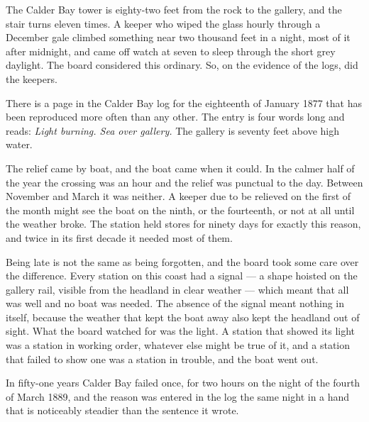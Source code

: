 \documentclass[11pt,twoside]{book}
\begin{document}
The Calder Bay tower is eighty-two feet from the rock to the gallery, and
the stair turns eleven times. A keeper who wiped the glass hourly through a
December gale climbed something near two thousand feet in a night, most of
it after midnight, and came off watch at seven to sleep through the short
grey daylight. The board considered this ordinary. So, on the evidence of the
logs, did the keepers.

There is a page in the Calder Bay log for the eighteenth of January 1877 that
has been reproduced more often than any other. The entry is four words long
and reads: \emph{Light burning. Sea over gallery.} The gallery is seventy
feet above high water.

\newpage

The relief came by boat, and the boat came when it could. In the calmer half
of the year the crossing was an hour and the relief was punctual to the day.
Between November and March it was neither. A keeper due to be relieved on the
first of the month might see the boat on the ninth, or the fourteenth, or not
at all until the weather broke. The station held stores for ninety days for
exactly this reason, and twice in its first decade it needed most of them.

Being late is not the same as being forgotten, and the board took some care
over the difference. Every station on this coast had a signal --- a shape
hoisted on the gallery rail, visible from the headland in clear weather ---
which meant that all was well and no boat was needed. The absence of the
signal meant nothing in itself, because the weather that kept the boat away
also kept the headland out of sight. What the board watched for was the
light. A station that showed its light was a station in working order,
whatever else might be true of it, and a station that failed to show one was
a station in trouble, and the boat went out.

In fifty-one years Calder Bay failed once, for two hours on the night of the
fourth of March 1889, and the reason was entered in the log the same night
in a hand that is noticeably steadier than the sentence it wrote.
\end{document}
